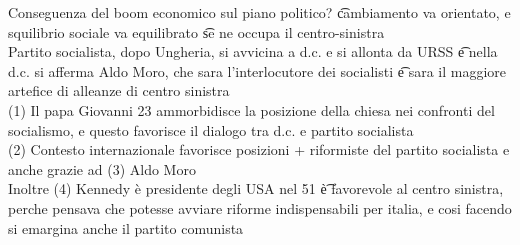 \documentclass[12pt]{article}
\begin{document}
Conseguenza del boom economico sul piano politico? \t cambiamento va orientato, e squilibrio sociale va equilibrato \t se ne occupa il centro-sinistra \\
Partito socialista, dopo Ungheria, si avvicina a d.c. e si allonta da URSS \t e nella d.c. si afferma Aldo Moro, che sara l'interlocutore dei socialisti \t e sara il maggiore artefice di alleanze di centro sinistra \\
(1) Il papa Giovanni 23 ammorbidisce la posizione della chiesa nei confronti del socialismo, e questo favorisce il dialogo tra d.c. e partito socialista \\
(2) Contesto internazionale favorisce posizioni + riformiste del partito socialista e anche grazie ad (3) Aldo Moro \\
Inoltre (4) Kennedy è presidente degli USA nel 51 \t è favorevole al centro sinistra, perche pensava che potesse avviare riforme indispensabili per italia, e cosi facendo si emargina anche il partito comunista
\end{document}
